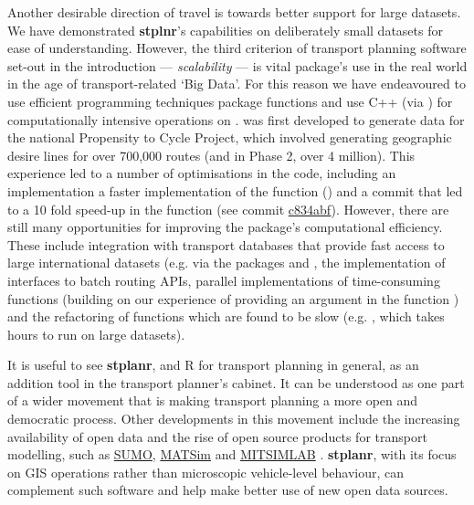 Another desirable direction of travel is towards better support for large datasets.
We have demonstrated \textbf{stplnr}'s capabilities on deliberately small datasets for ease of understanding.
However, the third criterion of transport planning software set-out in the introduction --- \emph{scalability} --- is vital package's use in the real world in the age of transport-related `Big Data'.
For this reason we have endeavoured to use efficient programming techniques package functions and use C++ (via ) for computationally intensive operations on .
 was first developed to generate data for the national
Propensity to Cycle Project, which involved generating geographic desire lines for over 700,000 routes \citep{lovelace_propensity_2017} (and in Phase 2, over 4 million).
This experience led to a number of optimisations in the code, including an implementation a faster implementation of the  function () and a commit that led to a 10 fold speed-up in the  function (see commit \href{https://github.com/ropensci/stplanr/commit/c834abf7d0020c6fbb33845572d6be4801f31f47}{c834abf}).
However, there are still many opportunities for improving the package's computational efficiency.
These include integration with transport databases that provide fast access to large international datasets (e.g. via the packages  and , the implementation of interfaces to batch routing APIs, parallel implementations of time-consuming functions (building on our experience of providing an  argument in the function ) and the refactoring of functions which are found to be slow (e.g. , which takes hours to run on large datasets).


It is useful to see \textbf{stplanr}, and R for transport planning in
general, as an addition tool in the transport planner's cabinet. It can
be understood as one part of a wider movement that is making transport
planning a more open and democratic process. Other developments in this
movement include the increasing availability of open data
\citep{naumova_building_2016} and the rise of open source products for
transport modelling, such as
\href{http://www.dlr.de/ts/en/desktopdefault.aspx/tabid-9883/16931_read-41000/}{SUMO},
\href{http://www.matsim.org/}{MATSim} and
\href{https://its.mit.edu/software/mitsimlab}{MITSIMLAB}
\citep{saidallah_comparative_2016}. \textbf{stplanr}, with its focus on
GIS operations rather than microscopic vehicle-level behaviour, can
complement such software and help make better use of new open data
sources.

